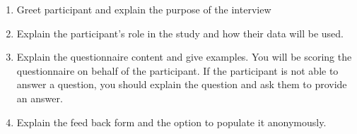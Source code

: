\begin{enumerate}
    \item Greet participant and explain the purpose of the interview
    \item Explain the participant's role in the study and how their data will be used.
    \item Explain the questionnaire content and give examples. You will be scoring the questionnaire on behalf of the participant. If the participant is not able to answer a question, you should explain the question and ask them to provide an answer.

    \item Explain the feed back form and the option to populate it anonymously.
\end{enumerate}